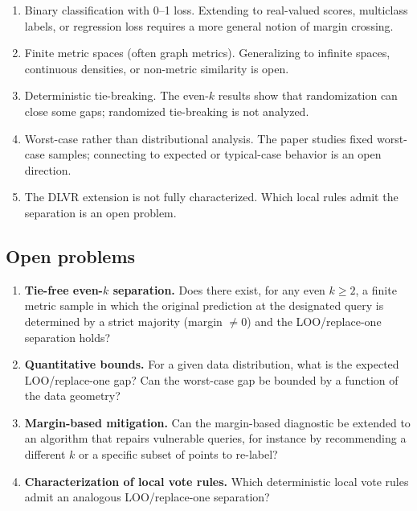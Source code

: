 \begin{enumerate}[leftmargin=*,label=(\arabic*)]
    \item Binary classification with 0--1 loss.  Extending to real-valued
        scores, multiclass labels, or regression loss requires a more general
        notion of margin crossing.
    \item Finite metric spaces (often graph metrics).  Generalizing to infinite
        spaces, continuous densities, or non-metric similarity is open.
    \item Deterministic tie-breaking.  The even-$k$ results show that
        randomization can close some gaps; randomized tie-breaking is not
        analyzed.
    \item Worst-case rather than distributional analysis.  The paper studies
        fixed worst-case samples; connecting to expected or typical-case
        behavior is an open direction.
    \item The DLVR extension is not fully characterized.  Which local rules
        admit the separation is an open problem.
\end{enumerate}

\subsection{Open problems}

\begin{enumerate}[leftmargin=*,label=(\arabic*)]
    \item \textbf{Tie-free even-$k$ separation.}  Does there exist, for any
        even $k \ge 2$, a finite metric sample in which the original prediction
        at the designated query is determined by a strict majority (margin $\neq
        0$) and the LOO/replace-one separation holds?
    \item \textbf{Quantitative bounds.}  For a given data distribution, what is
        the expected LOO/replace-one gap?  Can the worst-case gap be bounded by
        a function of the data geometry?
    \item \textbf{Margin-based mitigation.}  Can the margin-based diagnostic
        be extended to an algorithm that repairs vulnerable queries, for
        instance by recommending a different $k$ or a specific subset of points
        to re-label?
    \item \textbf{Characterization of local vote rules.}  Which deterministic
        local vote rules admit an analogous LOO/replace-one separation?
\end{enumerate}

